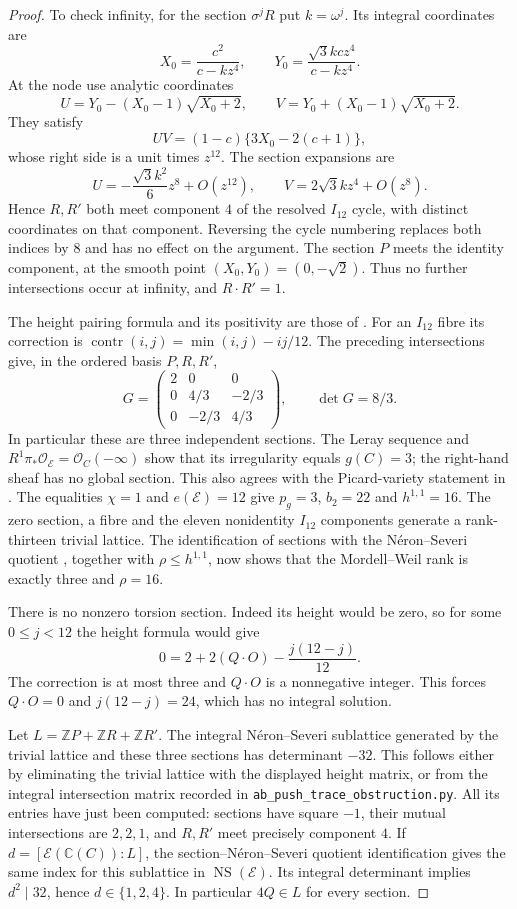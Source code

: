 \begin{proof}
To check infinity, for the section
$\sigma^jR$ put $k=\omega^j$. Its
integral coordinates are
\[
 X_0=\frac{c^2}{c-kz^4},\qquad
 Y_0=\frac{\sqrt3kc z^4}{c-kz^4}.
\]
At the node use analytic coordinates
\[
 U=Y_0-(X_0-1)\sqrt{X_0+2},\qquad
 V=Y_0+(X_0-1)\sqrt{X_0+2}.
\]
They satisfy
\[
 UV=(1-c)\{3X_0-2(c+1)\},
\]
whose right side is a unit times $z^{12}$.
The section expansions are
\[
 U=-\frac{\sqrt3k^2}{6}z^8+O(z^{12}),
 \qquad V=2\sqrt3kz^4+O(z^8).
\]
Hence $R,R'$ both meet component $4$
of the resolved $I_{12}$ cycle, with
distinct coordinates on that component.
Reversing the cycle numbering replaces
both indices by $8$ and has no effect
on the argument. The section $P$ meets
the identity component, at the smooth
point $(X_0,Y_0)=(0,-\sqrt2)$.
Thus no further intersections occur at
infinity, and $R\cdot R'=1$.

The height pairing formula and its
positivity are those of
\cite[Theorems 8.4 and 8.6, table (8.16)]{Shioda90}.
For an $I_{12}$ fibre its correction is
$\operatorname{contr}(i,j)=\min(i,j)-ij/12$.
The preceding intersections give, in
the ordered basis $P,R,R'$,
\[
 G=\begin{pmatrix}
 2&0&0\\
 0&4/3&-2/3\\
 0&-2/3&4/3
 \end{pmatrix},\qquad \det G=8/3.
\]
In particular these are three independent
sections. The Leray sequence and
$R^1\pi_*\mathcal O_{\mathscr E}
=\mathcal O_C(-\infty)$ show that its
irregularity equals $g(C)=3$; the
right-hand sheaf has no global section.
This also agrees with the Picard-variety
statement in \cite[Theorem 4.1]{Shioda90}.
The equalities $\chi=1$ and
$e(\mathscr E)=12$ give $p_g=3$,
$b_2=22$ and $h^{1,1}=16$.
The zero section, a fibre and the eleven
nonidentity $I_{12}$ components generate
a rank-thirteen trivial lattice.
The identification of sections with
the N\'eron--Severi quotient
\cite[Theorem 1.3]{Shioda90}, together
with $\rho\le h^{1,1}$, now shows that
the Mordell--Weil rank is exactly three
and $\rho=16$.

There is no nonzero torsion section.
Indeed its height would be zero, so
for some $0\le j<12$ the height formula
would give
\[
 0=2+2(Q\cdot O)-\frac{j(12-j)}{12}.
\]
The correction is at most three and
$Q\cdot O$ is a nonnegative integer.
This forces $Q\cdot O=0$ and
$j(12-j)=24$, which has no integral
solution.

Let $L=\mathbb ZP+\mathbb ZR+\mathbb ZR'$.
The integral N\'eron--Severi sublattice
generated by the trivial lattice and
these three sections has determinant
$-32$. This follows either by eliminating
the trivial lattice with the displayed
height matrix, or from the integral
intersection matrix recorded in
\texttt{ab\_push\_trace\_obstruction.py}.
All its entries have just been computed:
sections have square $-1$, their mutual
intersections are $2,2,1$, and $R,R'$
meet precisely component $4$.
If $d=[\mathscr E(\mathbb C(C)):L]$,
the section--N\'eron--Severi quotient
identification gives the same index
for this sublattice in
$\operatorname{NS}(\mathscr E)$.
Its integral determinant implies
$d^2\mid32$, hence $d\in\{1,2,4\}$.
In particular $4Q\in L$ for every section.


\end{proof}
